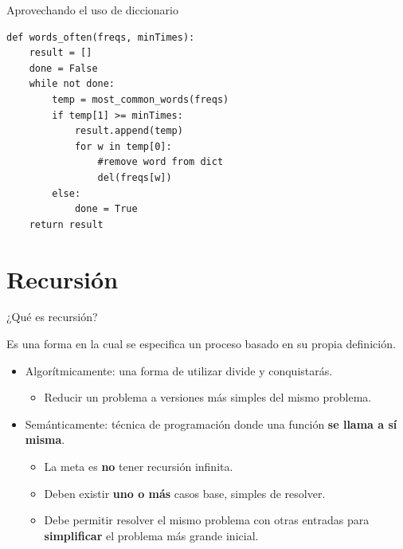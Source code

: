 \documentclass[mathserif]{beamer}
\begin{document}
\begin{frame}[fragile]{Aprovechando el uso de diccionario}
\begin{lstlisting}
def words_often(freqs, minTimes):
    result = []
    done = False
    while not done:
        temp = most_common_words(freqs)
        if temp[1] >= minTimes:
            result.append(temp)
            for w in temp[0]:
                #remove word from dict
                del(freqs[w])  
        else:
            done = True
    return result
\end{lstlisting}
\end{frame}


\section{Recursión}

\begin{frame}[fragile]{¿Qué es recursión?}
    \begin{blurb}
    Es una forma en la cual se especifica un proceso basado en su propia definición.
    \end{blurb}
    \begin{itemize}
        \item Algorítmicamente: una forma de utilizar {\blue divide y conquistarás}.
        \begin{itemize}
            \item Reducir un problema a versiones más simples del mismo problema.
        \end{itemize}
        
        \item Semánticamente: técnica de programación donde una función {\blue\bfseries se llama a sí misma}.
        \begin{itemize}
            \item La meta es {\blue\bfseries no} tener recursión infinita.
            \item Deben existir {\blue\bfseries uno o más} casos base, simples de resolver.
            \item Debe permitir resolver el mismo problema con otras entradas para {\blue\bfseries simplificar} el problema más grande inicial.
        \end{itemize}
    \end{itemize}
\end{frame}
\end{document}
